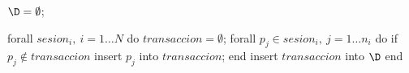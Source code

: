 $\D = \emptyset$;

forall $sesion_i,\ i = 1\ldots N$ do
  $transaccion = \emptyset$;
  forall $p_j \in sesion_i,\ j = 1\ldots n_i$ do
    if $p_j \notin transaccion$
      insert $p_j$ into $transaccion$;
  end
  insert $transaccion$ into $\D$
end
